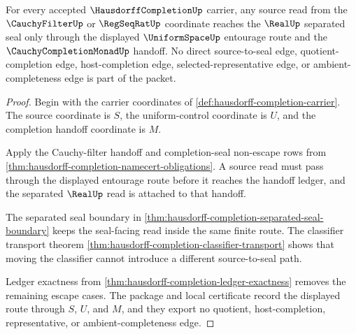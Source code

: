 \begin{theorem}
\label{thm:hausdorff-completion-cauchy-filter-seal}
For every accepted $\HausdorffCompletionUp$ carrier, any source read from the $\CauchyFilterUp$ or $\RegSeqRatUp$ coordinate reaches the $\RealUp$ separated seal only through the displayed $\UniformSpaceUp$ entourage route and the $\CauchyCompletionMonadUp$ handoff. No direct source-to-seal edge, quotient-completion edge, host-completion edge, selected-representative edge, or ambient-completeness edge is part of the packet.
\end{theorem}
\begin{proof}
Begin with the carrier coordinates of \autoref{def:hausdorff-completion-carrier}. The source coordinate is $S$, the uniform-control coordinate is $U$, and the completion handoff coordinate is $M$.

Apply the Cauchy-filter handoff and completion-seal non-escape rows from \autoref{thm:hausdorff-completion-namecert-obligations}. A source read must pass through the displayed entourage route before it reaches the handoff ledger, and the separated $\RealUp$ read is attached to that handoff.

The separated seal boundary in \autoref{thm:hausdorff-completion-separated-seal-boundary} keeps the seal-facing read inside the same finite route. The classifier transport theorem \autoref{thm:hausdorff-completion-classifier-transport} shows that moving the classifier cannot introduce a different source-to-seal path.

Ledger exactness from \autoref{thm:hausdorff-completion-ledger-exactness} removes the remaining escape cases. The package and local certificate record the displayed route through $S$, $U$, and $M$, and they export no quotient, host-completion, representative, or ambient-completeness edge.
\end{proof}

